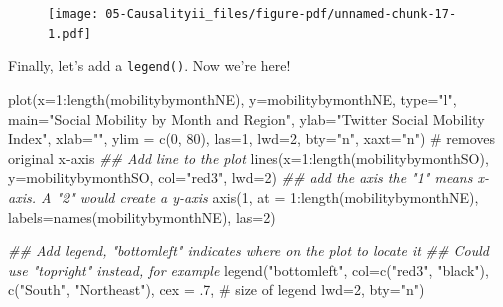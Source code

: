 \documentclass[
  letterpaper,
  DIV=11,
  numbers=noendperiod]{scrreprt}
\newenvironment{Shaded}{\begin{snugshade}}{\end{snugshade}}
\newcommand{\AttributeTok}[1]{\textcolor[rgb]{0.40,0.45,0.13}{#1}}
\newcommand{\CommentTok}[1]{\textcolor[rgb]{0.37,0.37,0.37}{#1}}
\newcommand{\DecValTok}[1]{\textcolor[rgb]{0.68,0.00,0.00}{#1}}
\newcommand{\DocumentationTok}[1]{\textcolor[rgb]{0.37,0.37,0.37}{\textit{#1}}}
\newcommand{\FunctionTok}[1]{\textcolor[rgb]{0.28,0.35,0.67}{#1}}
\newcommand{\NormalTok}[1]{\textcolor[rgb]{0.00,0.23,0.31}{#1}}
\newcommand{\SpecialCharTok}[1]{\textcolor[rgb]{0.37,0.37,0.37}{#1}}
\newcommand{\StringTok}[1]{\textcolor[rgb]{0.13,0.47,0.30}{#1}}
\begin{document}
\begin{figure}[H]

{\centering \texttt{[image: 05-Causalityii\_files/figure-pdf/unnamed-chunk-17-1.pdf]}

}

\end{figure}

Finally, let's add a \texttt{legend()}. Now we're here!

\begin{Shaded}
\begin{Highlighting}[]
\FunctionTok{plot}\NormalTok{(}\AttributeTok{x=}\DecValTok{1}\SpecialCharTok{:}\FunctionTok{length}\NormalTok{(mobilitybymonthNE),}
     \AttributeTok{y=}\NormalTok{mobilitybymonthNE,}
     \AttributeTok{type=}\StringTok{"l"}\NormalTok{, }
     \AttributeTok{main=}\StringTok{"Social Mobility by Month and Region"}\NormalTok{,}
     \AttributeTok{ylab=}\StringTok{"Twitter Social Mobility Index"}\NormalTok{,}
     \AttributeTok{xlab=}\StringTok{""}\NormalTok{,}
     \AttributeTok{ylim =} \FunctionTok{c}\NormalTok{(}\DecValTok{0}\NormalTok{, }\DecValTok{80}\NormalTok{),}
     \AttributeTok{las=}\DecValTok{1}\NormalTok{, }
     \AttributeTok{lwd=}\DecValTok{2}\NormalTok{, }
     \AttributeTok{bty=}\StringTok{"n"}\NormalTok{,}
     \AttributeTok{xaxt=}\StringTok{"n"}\NormalTok{) }\CommentTok{\# removes original x{-}axis}
\DocumentationTok{\#\# Add line to the plot }
\FunctionTok{lines}\NormalTok{(}\AttributeTok{x=}\DecValTok{1}\SpecialCharTok{:}\FunctionTok{length}\NormalTok{(mobilitybymonthSO),}
     \AttributeTok{y=}\NormalTok{mobilitybymonthSO, }\AttributeTok{col=}\StringTok{"red3"}\NormalTok{, }\AttributeTok{lwd=}\DecValTok{2}\NormalTok{)}
\DocumentationTok{\#\# add the axis the "1" means x{-}axis. A "2" would create a y{-}axis}
\FunctionTok{axis}\NormalTok{(}\DecValTok{1}\NormalTok{, }\AttributeTok{at =} \DecValTok{1}\SpecialCharTok{:}\FunctionTok{length}\NormalTok{(mobilitybymonthNE), }
     \AttributeTok{labels=}\FunctionTok{names}\NormalTok{(mobilitybymonthNE), }\AttributeTok{las=}\DecValTok{2}\NormalTok{)}

\DocumentationTok{\#\# Add legend, "bottomleft" indicates where on the plot to locate it}
\DocumentationTok{\#\# Could use "topright" instead, for example}
\FunctionTok{legend}\NormalTok{(}\StringTok{"bottomleft"}\NormalTok{,  }\AttributeTok{col=}\FunctionTok{c}\NormalTok{(}\StringTok{"red3"}\NormalTok{, }\StringTok{"black"}\NormalTok{), }
       \FunctionTok{c}\NormalTok{(}\StringTok{"South"}\NormalTok{, }\StringTok{"Northeast"}\NormalTok{), }
       \AttributeTok{cex =}\NormalTok{ .}\DecValTok{7}\NormalTok{, }\CommentTok{\# size of legend}
       \AttributeTok{lwd=}\DecValTok{2}\NormalTok{,}
       \AttributeTok{bty=}\StringTok{"n"}\NormalTok{)}
\end{Highlighting}
\end{Shaded}
\end{document}
